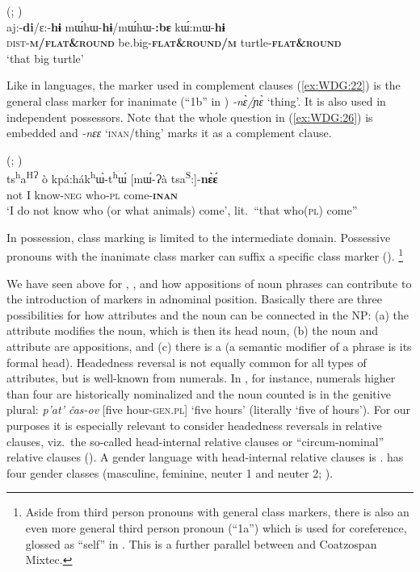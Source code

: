 \documentclass[output=collectionpaper]{langsci/langscibook}
\begin{document}
\ea\label{ex:WDG:25}
  (; \citealt[169]{Seifart2005})\\
\gll aj:-\textbf{di}/ɛ:-\textbf{hɨ}	mɯ́hɯ-\textbf{hɨ}/mɯ́hɯ-\textbf{:bɛ}	kɯ́:mɯ-\textbf{hɨ}\\
	\textsc{dist-\textbf{m/flat\&round}} 	be.big-\textbf{\textsc{flat\&round/m}}	turtle-\textbf{\textsc{flat\&round}}\\
\glt 	`that big turtle'\\
\z

Like in  languages, the marker used in complement clauses (\ref{ex:WDG:22}) is the general class marker for inanimate (``1b'' in ) \textit{-nɛ̀/ɲɛ̀} `thing'. It is also used in independent possessors. Note that the whole question in (\ref{ex:WDG:26}) is embedded and \textit{-nɛɛ} `\textsc{inan}/thing' marks it as a complement clause.

\ea\label{ex:WDG:26}
 (; \citealt[364]{Thiesen2012})\\
\gll ts\textsuperscript{h}a\textsuperscript{HɁ}	ò 	kpá:hák\textsuperscript{h}ɯ̀-t\textsuperscript{h}ɯ́	[mɯ́-Ɂà 	tsa\textsuperscript{S}:]-\textbf{nɛ̀ɛ́}\\
not	I	know-\textsc{neg}	who-\textsc{pl} 	come-\textbf{\textsc{inan}}\\
\glt	`I do not know who (or what animals) come', lit.\ ``that who(\textsc{pl}) come''\\
\z

In possession, class marking is limited to the intermediate domain. Possessive pronouns with the inanimate class marker can suffix a specific class marker (\citealt[179]{Thiesen2012}).%
\footnote{%
Aside from third person pronouns with general class markers, there is also an even more general third person pronoun (``1a'') which is used for coreference, glossed as ``self'' in \cite[360]{Thiesen2012}. This is a further parallel between  and Coatzospan Mixtec.
} %

We have seen above for , , and  how appositions of noun phrases can contribute to the introduction of markers in adnominal position. Basically there are three possibilities for how attributes and the noun can be connected in the NP: (a) the attribute modifies the noun, which is then its head noun, (b) the noun and attribute are appositions, and (c) there is a  (a semantic modifier of a phrase is its formal head). Headedness reversal is not equally common for all types of attributes, but is well-known from numerals. In , for instance, numerals higher than four are historically nominalized and the noun counted is in the genitive plural: \textit{p'at' čas-ov} [five hour-\textsc{gen.pl}] `five hours' (literally `five of hours'). For our purposes it is especially relevant to consider headedness reversals in relative clauses, viz.\ the so-called head-internal relative clauses or ``circum-nominal'' relative clauses (\citealt[109--121]{Lehmann1984}). A gender language with head-internal relative clauses is .  has four gender classes (masculine, feminine, neuter 1 and neuter 2; ).
\end{document}
